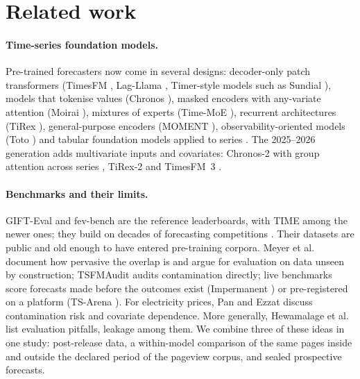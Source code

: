 \section{Related work}
\label{sec:related}

\paragraph{Time-series foundation models.} Pre-trained forecasters now come in several designs: decoder-only patch transformers
(TimesFM \citep{das2024timesfm}, Lag-Llama \citep{rasul2023lagllama}, Timer-style models such as Sundial \citep{liu2025sundial}),
models that tokenise values (Chronos \citep{ansari2024chronos}), masked encoders with any-variate attention (Moirai
\citep{woo2024moirai,liu2025moirai2}), mixtures of experts (Time-MoE \citep{shi2025timemoe}), recurrent architectures (TiRex
\citep{auer2025tirex}), general-purpose encoders (MOMENT \citep{goswami2024moment}), observability-oriented models (Toto
\citep{cohen2025toto,khwaja2026toto2}) and tabular foundation models applied to series \citep{hoo2026tabpfnts}. The 2025--2026
generation adds multivariate inputs and covariates: Chronos-2 with group attention across series \citep{ansari2025chronos2}, TiRex-2
\citep{podest2026tirex2} and TimesFM~3 \citep{jain2026timesfm3}.

\paragraph{Benchmarks and their limits.} GIFT-Eval \citep{aksu2024gifteval} and fev-bench \citep{shchur2025fevbench} are the
reference leaderboards, with TIME \citep{qiao2026time} among the newer ones; they build on decades of forecasting competitions
\citep{makridakis2020m4,makridakis2022m5}. Their datasets are public and old enough to have entered pre-training corpora. Meyer et
al.\ \citep{meyer2025leakage} document how pervasive the overlap is and argue for evaluation on data unseen by construction;
TSFMAudit \citep{li2026tsfmaudit} audits contamination directly; live benchmarks score forecasts made before the outcomes exist
(Impermanent \citep{garza2026impermanent}) or pre-registered on a platform (TS-Arena \citep{meyer2026tsarena}). For electricity
prices, Pan and Ezzat \citep{pan2026electricity} discuss contamination risk and covariate dependence. More generally, Hewamalage et
al.\ \citep{hewamalage2023forecast} list evaluation pitfalls, leakage among them. We combine three of these ideas in one study:
post-release data, a within-model comparison of the same pages inside and outside the declared period of the pageview corpus, and sealed
prospective forecasts.

